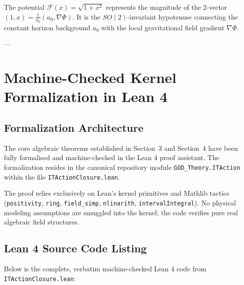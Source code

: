 \documentclass[11pt,a4paper]{article}
\theoremstyle{definition}
\begin{document}
\begin{remark}
The potential $\mathcal{F}(x) = \sqrt{1+x^2}$ represents the magnitude of the 2-vector $(1, x) = \frac{1}{a_0}(a_0, \nabla\Phi)$. It is the $SO(2)$-invariant hypotenuse connecting the constant horizon background $a_0$ with the local gravitational field gradient $\nabla\Phi$.
\end{remark}

---

\section{Machine-Checked Kernel Formalization in Lean 4}

\subsection{Formalization Architecture}
The core algebraic theorems established in Section~3 and Section~4 have been fully formalised and machine-checked in the Lean 4 proof assistant. The formalization resides in the canonical repository module \texttt{GOD\_Theory.ITAction} within the file \texttt{ITActionClosure.lean}.

The proof relies exclusively on Lean's kernel primitives and Mathlib tactics (\texttt{positivity}, \texttt{ring}, \texttt{field\_simp}, \texttt{nlinarith}, \texttt{intervalIntegral}). No physical modeling assumptions are smuggled into the kernel; the code verifies pure real algebraic field structures.

\subsection{Lean 4 Source Code Listing}
Below is the complete, verbatim machine-checked Lean 4 code from \texttt{ITActionClosure.lean}:
\end{document}
